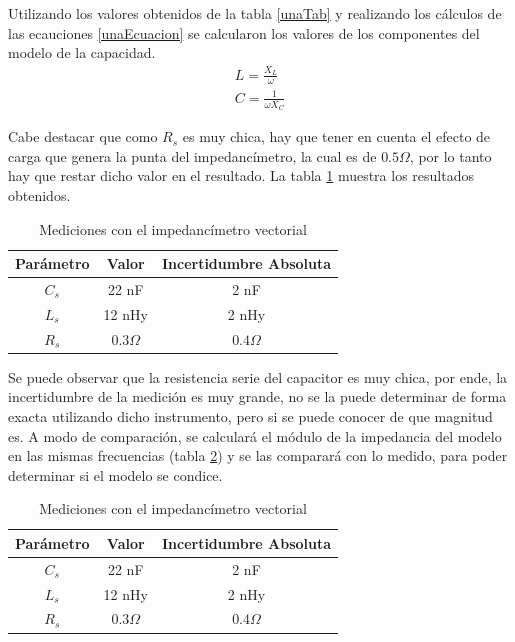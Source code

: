 \documentclass[a4paper,10pt]{article}
\begin{document}
		\indent Utilizando los valores obtenidos de la tabla \ref{unaTab} y 
		realizando los cálculos de las ecauciones \ref{unaEcuacion} se 
		calcularon los valores de los componentes del modelo de la capacidad. \\
		
		\begin{align}\label{unaEcuacion}
			L = \frac{X_L}{\omega} \nonumber \\
			C = \frac{1}{\omega X_C} 
		\end{align}

		\indent Cabe destacar que como $R_s$ es muy chica, hay que tener en 
		cuenta el efecto de carga que genera la punta del impedancímetro, la 
		cual es de $0.5 \Omega$, por lo tanto hay que restar dicho valor en el
		resultado. La tabla \ref{otraTab} muestra los resultados obtenidos.
		
		\begin{table}[!htp]
			\centering
			\begin{tabular}{|c|c|c|}
				\hline
				Parámetro & Valor & Incertidumbre Absoluta \\ 
				\hline
				$C_s$ & 22 nF & 2 nF \\
				\hline
				$L_s$ & 12 nHy & 2 nHy \\
				\hline
				$R_s$ & $0.3 \Omega$ & $0.4 \Omega$ \\ 
				\hline
			\end{tabular}
			\caption{Mediciones con el impedancímetro vectorial} \label{otraTab}
		\end{table}

		\indent Se puede observar que la resistencia serie del capacitor es 
		muy chica, por ende, la incertidumbre de la medición es muy grande, no 
		se la puede determinar de forma exacta utilizando dicho instrumento, 
		pero si se puede conocer de que magnitud es. 
		\indent A modo de comparación, se calculará el módulo de la impedancia 
		del modelo en las mismas frecuencias (tabla \ref{tab:009}) y se las 
		comparará con lo medido, para poder determinar si el modelo se condice.

		\begin{table}[!htp]
			\centering
			\begin{tabular}{|c|c|c|}
				\hline
				Parámetro & Valor & Incertidumbre Absoluta \\ 
				\hline
				$C_s$ & 22 nF & 2 nF \\
				\hline
				$L_s$ & 12 nHy & 2 nHy \\
				\hline
				$R_s$ & $0.3 \Omega$ & $0.4 \Omega$ \\ 
				\hline
			\end{tabular}
			\caption{Mediciones con el impedancímetro vectorial} \label{tab:009}
		\end{table}
\end{document}
